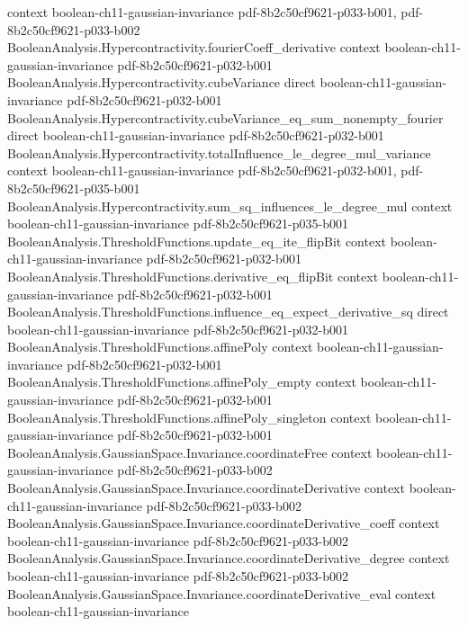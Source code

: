 \begin{theorem}
  {context}
  {boolean-ch11-gaussian-invariance}
  {pdf-8b2c50cf9621-p033-b001,
    pdf-8b2c50cf9621-p033-b002}
\proofstep
  {BooleanAnalysis.Hypercontractivity.fourierCoeff_derivative}
  {context}
  {boolean-ch11-gaussian-invariance}
  {pdf-8b2c50cf9621-p032-b001}
\proofstep
  {BooleanAnalysis.Hypercontractivity.cubeVariance}
  {direct}
  {boolean-ch11-gaussian-invariance}
  {pdf-8b2c50cf9621-p032-b001}
\proofstep
  {BooleanAnalysis.Hypercontractivity.cubeVariance_eq_sum_nonempty_fourier}
  {direct}
  {boolean-ch11-gaussian-invariance}
  {pdf-8b2c50cf9621-p032-b001}
\proofstep
  {BooleanAnalysis.Hypercontractivity.totalInfluence_le_degree_mul_variance}
  {context}
  {boolean-ch11-gaussian-invariance}
  {pdf-8b2c50cf9621-p032-b001,
    pdf-8b2c50cf9621-p035-b001}
\proofstep
  {BooleanAnalysis.Hypercontractivity.sum_sq_influences_le_degree_mul}
  {context}
  {boolean-ch11-gaussian-invariance}
  {pdf-8b2c50cf9621-p035-b001}
\proofstep
  {BooleanAnalysis.ThresholdFunctions.update_eq_ite_flipBit}
  {context}
  {boolean-ch11-gaussian-invariance}
  {pdf-8b2c50cf9621-p032-b001}
\proofstep
  {BooleanAnalysis.ThresholdFunctions.derivative_eq_flipBit}
  {context}
  {boolean-ch11-gaussian-invariance}
  {pdf-8b2c50cf9621-p032-b001}
\proofstep
  {BooleanAnalysis.ThresholdFunctions.influence_eq_expect_derivative_sq}
  {direct}
  {boolean-ch11-gaussian-invariance}
  {pdf-8b2c50cf9621-p032-b001}
\proofstep
  {BooleanAnalysis.ThresholdFunctions.affinePoly}
  {context}
  {boolean-ch11-gaussian-invariance}
  {pdf-8b2c50cf9621-p032-b001}
\proofstep
  {BooleanAnalysis.ThresholdFunctions.affinePoly_empty}
  {context}
  {boolean-ch11-gaussian-invariance}
  {pdf-8b2c50cf9621-p032-b001}
\proofstep
  {BooleanAnalysis.ThresholdFunctions.affinePoly_singleton}
  {context}
  {boolean-ch11-gaussian-invariance}
  {pdf-8b2c50cf9621-p032-b001}
\proofstep
  {BooleanAnalysis.GaussianSpace.Invariance.coordinateFree}
  {context}
  {boolean-ch11-gaussian-invariance}
  {pdf-8b2c50cf9621-p033-b002}
\proofstep
  {BooleanAnalysis.GaussianSpace.Invariance.coordinateDerivative}
  {context}
  {boolean-ch11-gaussian-invariance}
  {pdf-8b2c50cf9621-p033-b002}
\proofstep
  {BooleanAnalysis.GaussianSpace.Invariance.coordinateDerivative_coeff}
  {context}
  {boolean-ch11-gaussian-invariance}
  {pdf-8b2c50cf9621-p033-b002}
\proofstep
  {BooleanAnalysis.GaussianSpace.Invariance.coordinateDerivative_degree}
  {context}
  {boolean-ch11-gaussian-invariance}
  {pdf-8b2c50cf9621-p033-b002}
\proofstep
  {BooleanAnalysis.GaussianSpace.Invariance.coordinateDerivative_eval}
  {context}
  {boolean-ch11-gaussian-invariance}

\end{theorem}
